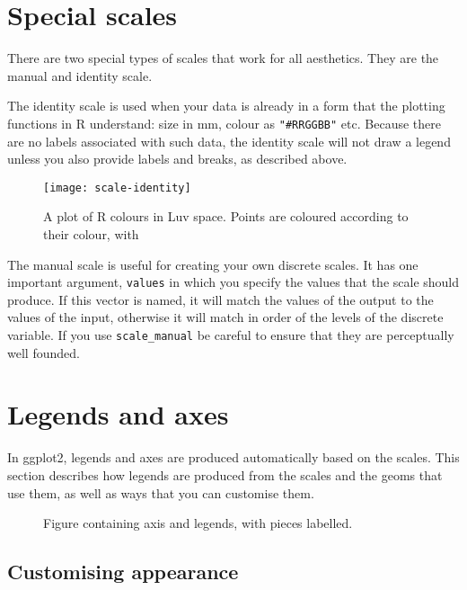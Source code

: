 \section{Special scales}

There are two special types of scales that work for all aesthetics.  They are the manual and identity scale.  

The identity scale is used when your data is already in a form that the plotting functions in R understand: size in mm, colour as \verb|"#RRGGBB"| etc. Because there are no labels associated with such data, the identity scale will not draw a legend unless you also provide labels and breaks, as described above. 

\begin{figure}[htbp]
  \centering
    \texttt{[image: scale-identity]}
  \caption{A plot of R colours in Luv space.  Points are coloured according to their colour, with }
  \label{fig:scale-identity}
\end{figure}

The manual scale is useful for creating your own discrete scales.  It has one important argument, \verb|values| in which you specify the values that the scale should produce.  If this vector is named, it will match the values of the output to the values of the input, otherwise it will match in order of the levels of the discrete variable.  If you use \verb|scale_manual| be careful to ensure that they are perceptually well founded.


\section{Legends and axes}
\label{sec:legends_and_axes}

In ggplot2, legends and axes are produced automatically based on the scales.  This section describes how legends are produced from the scales and the geoms that use them, as well as ways that you can customise them.

\begin{figure}[htbp]
  \centering
  \caption{Figure containing axis and legends, with pieces labelled.}
  \label{fig:label}
\end{figure}

\subsection{Customising appearance}

